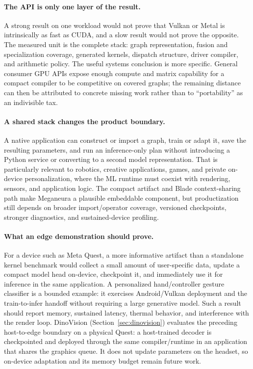 \documentclass[10pt,twocolumn]{article}
\newcommand{\system}{Meganeura}
\begin{document}
\paragraph{The API is only one layer of the result.}
A strong result on one workload would not prove that Vulkan or Metal is
intrinsically as fast as CUDA, and a slow result would not prove the opposite.
The measured unit is the complete stack: graph representation, fusion and
specialization coverage, generated kernels, dispatch structure, driver
compiler, and arithmetic policy. The useful systems conclusion is more
specific. General consumer GPU APIs expose enough compute and matrix
capability for a compact compiler to be competitive on covered graphs; the
remaining distance can then be attributed to concrete missing work rather
than to ``portability'' as an indivisible tax.

\paragraph{A shared stack changes the product boundary.}
A native application can construct or import a graph, train or adapt it, save
the resulting parameters, and run an inference-only plan without introducing
a Python service or converting to a second model representation. That is
particularly relevant to robotics, creative applications, games, and private
on-device personalization, where the ML runtime must coexist with rendering,
sensors, and application logic. The compact artifact and Blade context-sharing
path make \system{} a plausible embeddable component, but productization still
depends on broader import/operator coverage, versioned checkpoints, stronger
diagnostics, and sustained-device profiling.

\paragraph{What an edge demonstration should prove.}
For a device such as Meta Quest, a more informative artifact than a standalone
kernel benchmark would collect a small amount of user-specific data, update a
compact model head on-device, checkpoint it, and immediately use it for
inference in the same application. A personalized hand/controller gesture
classifier is a bounded example: it exercises Android/Vulkan deployment and
the train-to-infer handoff without requiring a large generative model. Such a
result should report memory, sustained latency, thermal behavior, and
interference with the render loop. DinoVision
(Section~\ref{sec:dinovision}) evaluates the preceding host-to-edge boundary
on a physical Quest: a host-trained decoder is checkpointed and deployed
through the same compiler/runtime in an application that shares the graphics
queue. It does not update parameters on the headset, so on-device adaptation
and its memory budget remain future work.
\end{document}
